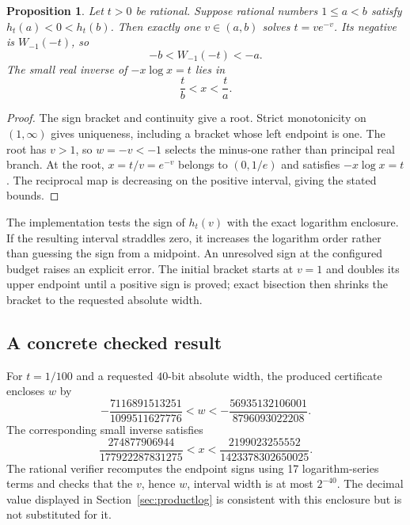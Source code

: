 \documentclass[11pt,a4paper]{article}
\newtheorem{proposition}{Proposition}[section]
\begin{document}
\begin{proposition}
Let $t>0$ be rational. Suppose rational numbers $1\le a<b$ satisfy $h_t(a)<0<h_t(b)$. Then exactly one $v\in(a,b)$ solves $t=v e^{-v}$. Its negative is $W_{-1}(-t)$, so
\begin{equation}
 -b<W_{-1}(-t)<-a.
\end{equation}
The small real inverse of $-x\log x=t$ lies in
\begin{equation}
 \frac{t}{b}<x<\frac{t}{a}.
\end{equation}
\end{proposition}
\begin{proof}
The sign bracket and continuity give a root. Strict monotonicity on $(1,\infty)$ gives uniqueness, including a bracket whose left endpoint is one. The root has $v>1$, so $w=-v<-1$ selects the minus-one rather than principal real branch. At the root, $x=t/v=e^{-v}$ belongs to $(0,1/e)$ and satisfies $-x\log x=t$. The reciprocal map is decreasing on the positive interval, giving the stated bounds.
\end{proof}

The implementation tests the sign of $h_t(v)$ with the exact logarithm enclosure. If the resulting interval straddles zero, it increases the logarithm order rather than guessing the sign from a midpoint. An unresolved sign at the configured budget raises an explicit error. The initial bracket starts at $v=1$ and doubles its upper endpoint until a positive sign is proved; exact bisection then shrinks the bracket to the requested absolute width.

\subsection{A concrete checked result}
For $t=1/100$ and a requested $40$-bit absolute width, the produced certificate encloses $w$ by
\begin{equation}
 -\frac{7116891513251}{1099511627776}
 < w <
 -\frac{56935132106001}{8796093022208}.
\end{equation}
The corresponding small inverse satisfies
\begin{equation}
 \frac{274877906944}{177922287831275}
 < x <
 \frac{2199023255552}{1423378302650025}.
\end{equation}
The rational verifier recomputes the endpoint signs using 17 logarithm-series terms and checks that the $v$, hence $w$, interval width is at most $2^{-40}$. The decimal value displayed in Section~\ref{sec:productlog} is consistent with this enclosure but is not substituted for it.
\end{document}
